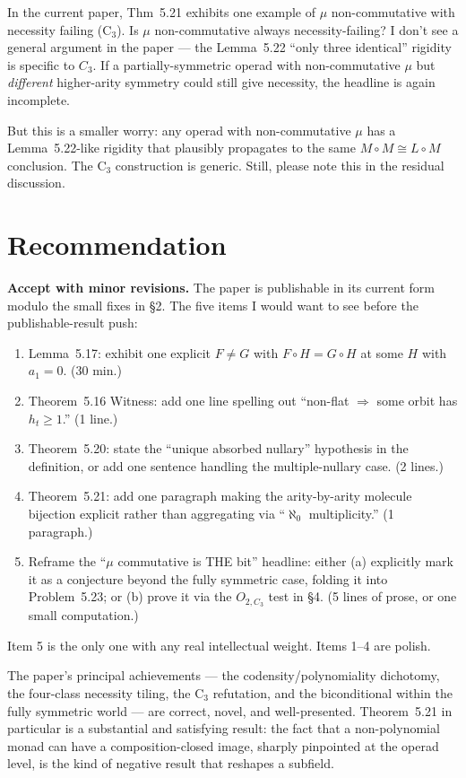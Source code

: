 \documentclass[11pt]{article}
\begin{document}
In the current paper, Thm~5.21 exhibits one example of $\mu$ non-commutative with necessity failing (C$_3$). Is $\mu$ non-commutative always necessity-failing? I don't see a general argument in the paper — the Lemma~5.22 ``only three identical'' rigidity is specific to $C_3$. If a partially-symmetric operad with non-commutative $\mu$ but \emph{different} higher-arity symmetry could still give necessity, the headline is again incomplete.

But this is a smaller worry: any operad with non-commutative $\mu$ has a Lemma~5.22-like rigidity that plausibly propagates to the same $M \circ M \cong L \circ M$ conclusion. The C$_3$ construction is generic. Still, please note this in the residual discussion.

\section{Recommendation}

\textbf{Accept with minor revisions.} The paper is publishable in its current form modulo the small fixes in §2. The five items I would want to see before the publishable-result push:

\begin{enumerate}[leftmargin=1.5em, itemsep=1pt]
  \item Lemma~5.17: exhibit one explicit $F \ne G$ with $F \circ H = G \circ H$ at some $H$ with $a_1 = 0$. (30 min.)
  \item Theorem~5.16 Witness: add one line spelling out ``non-flat $\Rightarrow$ some orbit has $h_t \ge 1$.'' (1 line.)
  \item Theorem~5.20: state the ``unique absorbed nullary'' hypothesis in the definition, or add one sentence handling the multiple-nullary case. (2 lines.)
  \item Theorem~5.21: add one paragraph making the arity-by-arity molecule bijection explicit rather than aggregating via ``$\aleph_0$ multiplicity.'' (1 paragraph.)
  \item Reframe the ``$\mu$ commutative is THE bit'' headline: either (a) explicitly mark it as a conjecture beyond the fully symmetric case, folding it into Problem~5.23; or (b) prove it via the $O_{2, C_3}$ test in §4. (5 lines of prose, or one small computation.)
\end{enumerate}

Item 5 is the only one with any real intellectual weight. Items 1–4 are polish.

The paper's principal achievements — the codensity/polynomiality dichotomy, the four-class necessity tiling, the C$_3$ refutation, and the biconditional within the fully symmetric world — are correct, novel, and well-presented. Theorem~5.21 in particular is a substantial and satisfying result: the fact that a non-polynomial monad can have a composition-closed image, sharply pinpointed at the operad level, is the kind of negative result that reshapes a subfield.
\end{document}
